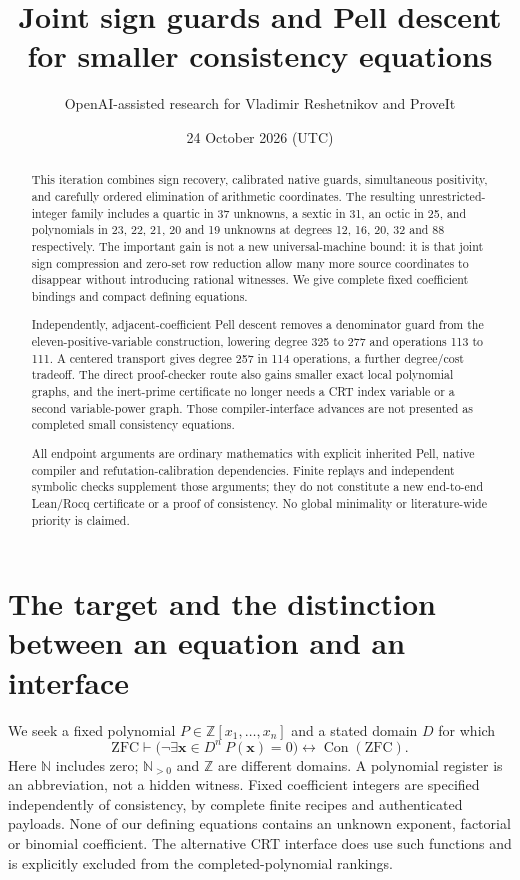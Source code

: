 \documentclass[11pt]{article}
\title{Joint sign guards and Pell descent\\for smaller consistency equations}
\author{OpenAI-assisted research for Vladimir Reshetnikov and ProveIt}
\date{24 October 2026 (UTC)}
\newcommand{\Z}{\mathbb Z}\newcommand{\N}{\mathbb N}
\newcommand{\Con}{\operatorname{Con}}
\begin{document}
\maketitle
\begin{abstract}
This iteration combines sign recovery, calibrated native guards, simultaneous
positivity, and carefully ordered elimination of arithmetic coordinates.
The resulting unrestricted-integer family includes a quartic in 37 unknowns,
a sextic in 31, an octic in 25, and polynomials in 23, 22, 21, 20 and 19
unknowns at degrees 12, 16, 20, 32 and 88 respectively. The important gain is not a new universal-machine bound: it is
that joint sign compression and zero-set row reduction allow many more
source coordinates to disappear without introducing rational witnesses.
We give complete fixed coefficient bindings and compact defining equations.

Independently, adjacent-coefficient Pell descent removes a denominator guard
from the eleven-positive-variable construction, lowering degree 325 to 277
and operations 113 to 111. A centered transport gives degree 257 in 114 operations, a further degree/cost
tradeoff. The direct proof-checker route also gains smaller exact local
polynomial graphs, and the inert-prime certificate no longer needs a CRT
index variable or a second variable-power graph. Those compiler-interface
advances are not presented as completed small consistency equations.

All endpoint arguments are ordinary mathematics with explicit inherited
Pell, native compiler and refutation-calibration dependencies. Finite replays
and independent symbolic checks supplement those arguments; they do not
constitute a new end-to-end Lean/Rocq certificate or a proof of consistency.
No global minimality or literature-wide priority is claimed.
\end{abstract}
\tableofcontents
\section{The target and the distinction between an equation and an interface}
We seek a fixed polynomial $P\in\Z[x_1,\ldots,x_n]$ and a stated domain $D$
for which
\[
\mathrm{ZFC}\vdash
\bigl(\neg\exists\boldsymbol{x}\in D^n\ P(\boldsymbol{x})=0\bigr)
\longleftrightarrow\Con(\mathrm{ZFC}).
\]
Here $\N$ includes zero; $\N_{>0}$ and $\Z$ are different domains.
A polynomial register is an abbreviation, not a hidden witness. Fixed
coefficient integers are specified independently of consistency, by complete
finite recipes and authenticated payloads. None of our defining equations
contains an unknown exponent, factorial or binomial coefficient.
The alternative CRT interface does use such functions and is explicitly
excluded from the completed-polynomial rankings.
\end{document}
